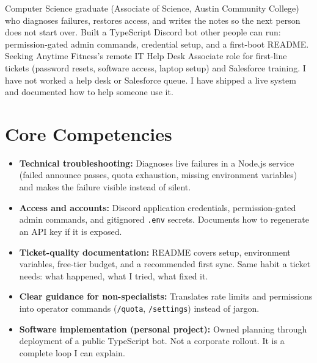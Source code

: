 \documentclass[11pt,a4paper,sans]{moderncv}
\begin{document}
\makecvtitle


\vspace{6pt}
\small{Computer Science graduate (Associate of Science, Austin Community College) who diagnoses failures, restores access, and writes the notes so the next person does not start over. Built a TypeScript Discord bot other people can run: permission-gated admin commands, credential setup, and a first-boot README. Seeking Anytime Fitness's remote IT Help Desk Associate role for first-line tickets (password resets, software access, laptop setup) and Salesforce training. I have not worked a help desk or Salesforce queue. I have shipped a live system and documented how to help someone use it.}


\section{Core Competencies}
\vspace{1pt}
\begin{itemize}

\item \textbf{Technical troubleshooting:} Diagnoses live failures in a Node.js service (failed announce passes, quota exhaustion, missing environment variables) and makes the failure visible instead of silent.

\item \textbf{Access and accounts:} Discord application credentials, permission-gated admin commands, and gitignored \texttt{.env} secrets. Documents how to regenerate an API key if it is exposed.

\item \textbf{Ticket-quality documentation:} README covers setup, environment variables, free-tier budget, and a recommended first sync. Same habit a ticket needs: what happened, what I tried, what fixed it.

\item \textbf{Clear guidance for non-specialists:} Translates rate limits and permissions into operator commands (\texttt{/quota}, \texttt{/settings}) instead of jargon.

\item \textbf{Software implementation (personal project):} Owned planning through deployment of a public TypeScript bot. Not a corporate rollout. It is a complete loop I can explain.

\end{itemize}
\end{document}
